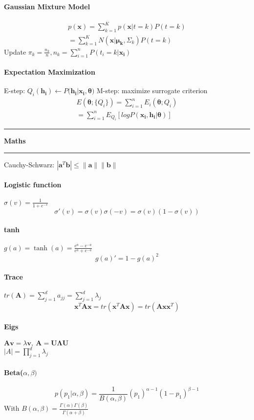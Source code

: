 \documentclass[7pt]{scrartcl}
\newlength{\secskip}
\renewcommand{\section}[1]{
  \vspace{\secskip}
  \hrule\vspace{.3em}
  \textbf{#1}
  \vspace{.3em}
  \hrule
  \vspace{\secskip}
}
\renewcommand{\vec}{\mathbf}
\begin{document}
\begin{multicols}{4}
\paragraph{Gaussian Mixture Model}
\begin{align*}
p(\vec{x}) = \sum_{k=1}^K p(\vec{x}|t=k) P(t=k) \\
=  \sum_{k=1}^K N(\vec{x}|\vec{\mu_k},\Sigma_k)P(t=k)
\end{align*}
Update $\pi_k = \frac{n_k}{n}, n_k = \sum_{i=1}^nP(t_i=k|\vec{x_i})$

\paragraph{Expectation Maximization}
E-step: $Q_i(\vec{h_i}) \leftarrow P(\vec{h_i}|\vec{x_i},\vec{\theta)}$
M-step: maximize surrogate criterion
\begin{align*}
E(\vec{\theta};\{Q_i\}) = \sum_{i=1}^n E_i(\vec{\theta};Q_i) \\= \sum_{i=1}^n E_{Q_i} [logP(\vec{x_i},\vec{h_i}|\vec{\theta})]
\end{align*}

\section{Maths} 
Cauchy-Schwarz: $|\vec a ^T \vec b|\leq \| \vec a \| \| \vec b \|$
\paragraph{Logistic function}
$\sigma(v) = \frac{1}{1+e^{-v}}$
$$\sigma'(v) = \sigma(v)\sigma(-v) = \sigma(v)(1-\sigma(v))$$
\paragraph{tanh}
$g(a)=\tanh(a)=\frac{e^a-e^{-a}}{e^a + e^{-a}}$
$$g(a)'=1 - g(a)^2$$
\paragraph{Trace}
$tr(\vec{A}) = \sum_{j=1}^{d}a_{jj} = \sum_{j=1}^d \lambda_j$
\[\vec{x}^T \vec{A} \vec{x} = tr(\vec{x}^T \vec{A} \vec{x}) = tr(\vec{A} \vec{xx}^T)\]
\paragraph{Eigs}
$\vec{Av} = \lambda \vec{v}, ~\vec{A} = \vec{U \Lambda U}$\\
$|A| = \prod_{j=1}^d \lambda_j$
\paragraph{Beta($\alpha,\beta)$}
\[p(p_1|\alpha,\beta) = \frac{1}{B(\alpha,\beta)}(p_1)^{\alpha-1}(1-p_1)^{\beta -1}\]
With $B(\alpha,\beta) = \frac{\Gamma(\alpha)\Gamma(\beta)}{\Gamma(\alpha + \beta)}$

\end{multicols}
\end{document}
